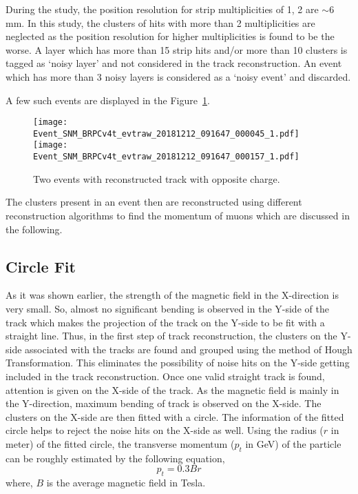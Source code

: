 During the study, the position resolution for strip multiplicities of
1, 2 are $\sim$6\,mm. In this study, the clusters of hits with more
than 2 multiplicities are neglected as the position resolution for
higher multiplicities is found to be the worse. A layer which has
more than 15 strip hits and/or more than 10 clusters is tagged as
`noisy layer' and not considered in the track reconstruction. An
event which has more than 3 noisy layers is considered as a
`noisy event' and discarded.

A few such events are displayed in the Figure~\ref{fig:eventdisplay}.
\begin{figure}[h]
  \texttt{[image: Event\_SNM\_BRPCv4t\_evtraw\_20181212\_091647\_000045\_1.pdf]}
  \texttt{[image: Event\_SNM\_BRPCv4t\_evtraw\_20181212\_091647\_000157\_1.pdf]}
  \caption{Two events with reconstructed track with opposite charge.}
  \label{fig:eventdisplay}
\end{figure}

The clusters present in an event then are reconstructed using
different reconstruction algorithms to find the momentum of muons
which are discussed in the following.

\subsection{Circle Fit}
As it was shown earlier, the strength of the magnetic field in the
X-direction is very small. So, almost no significant bending is
observed in the Y-side of the track which makes the projection of
the track on the Y-side to be fit with a straight line.
Thus, in the first step of track reconstruction, the clusters on
the Y-side associated with the tracks are found and grouped using
the method of Hough Transformation\cite{hought}. This eliminates
the possibility of noise hits on the Y-side getting included in the
track reconstruction. Once one valid straight track is found, attention
is given on the X-side of the track. As the magnetic field is mainly
in the Y-direction, maximum bending of track is observed on the X-side.
The clusters on the X-side are then fitted with a circle.
The information of the fitted circle helps to reject the noise hits
on the X-side as well.
Using the radius ($r$ in meter) of the fitted circle, the transverse
momentum ($p_t$ in GeV) of the particle can be roughly estimated by
the following equation,
\begin{equation}
  p_{t}=0.3Br \label{eq:pt_est}
\end{equation}
where, $B$ is the average magnetic field in Tesla.


